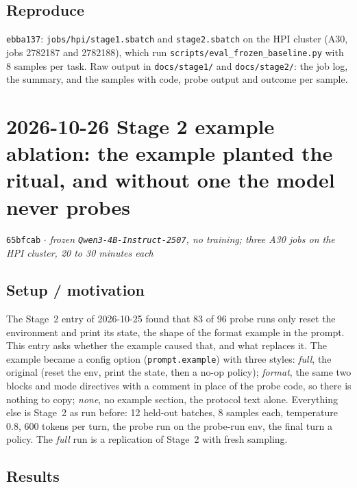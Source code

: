 \documentclass[11pt,a4paper]{article}
\newcommand{\commit}[1]{\texttt{\textcolor{commitgray}{#1}}}
\begin{document}
\subsection*{Reproduce}

\commit{ebba137}: \texttt{jobs/hpi/stage1.sbatch} and \texttt{stage2.sbatch} on
the HPI cluster (A30, jobs 2782187 and 2782188), which run
\texttt{scripts/eval\_frozen\_baseline.py} with 8 samples per task. Raw
output in \texttt{docs/stage1/} and \texttt{docs/stage2/}: the job log, the
summary, and the samples with code, probe output and outcome per sample.

\section*{2026-10-26 \quad Stage 2 example ablation: the example planted the
ritual, and without one the model never probes}

\commit{65bfcab} $\cdot$ \textit{frozen \texttt{Qwen3-4B-Instruct-2507}, no
training; three A30 jobs on the HPI cluster, 20 to 30 minutes each}

\subsection*{Setup / motivation}

The Stage~2 entry of 2026-10-25 found that 83 of 96 probe runs only reset the
environment and print its state, the shape of the format example in the
prompt. This entry asks whether the example caused that, and what replaces
it. The example became a config option (\texttt{prompt.example}) with three
styles: \emph{full}, the original (reset the env, print the state, then a
no-op policy); \emph{format}, the same two blocks and mode directives with a
comment in place of the probe code, so there is nothing to copy; \emph{none},
no example section, the protocol text alone. Everything else is Stage~2 as
run before: 12 held-out batches, 8 samples each, temperature 0.8, 600 tokens
per turn, the probe run on the probe-run env, the final turn a policy. The
\emph{full} run is a replication of Stage~2 with fresh sampling.

\subsection*{Results}
\end{document}
